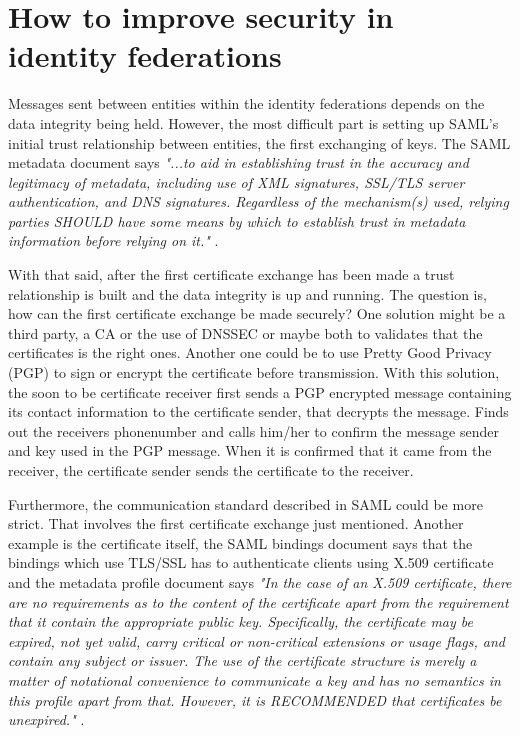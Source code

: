 \section{How to improve security in identity federations}

Messages sent between entities within the identity federations depends on the data integrity being held.
However, the most difficult part is setting up SAML's initial trust relationship between entities, the first exchanging of keys.
The SAML metadata document says \emph{"...to aid in establishing trust in the accuracy and legitimacy of metadata,
including use of XML signatures, SSL/TLS server authentication, and DNS signatures.
Regardless of the mechanism(s) used, relying parties SHOULD have some means by which to establish trust in metadata information
before relying on it."} \cite[p.~29]{pdf:oasis-open-metadata}.

With that said, after the first certificate exchange has been made a trust relationship is built and the data integrity is up and running. 
The question is, how can the first certificate exchange be made securely? 
One solution might be a third party, a CA or the use of DNSSEC or maybe both to validates that the certificates is the right ones.
Another one could be to use Pretty Good Privacy (PGP)  \cite{rfc:2440} to sign or encrypt the certificate before transmission.
With this solution, the soon to be certificate receiver first sends a PGP encrypted message containing its contact
information to the certificate sender, that decrypts the message. Finds out the receivers phonenumber and calls him/her
to confirm the message sender and key used in the PGP message.
When it is confirmed that it came from the receiver, the certificate sender sends the certificate to the receiver.

Furthermore, the communication standard described in SAML could be more strict.
That involves the first certificate exchange just mentioned. 
Another example is the certificate itself, the SAML bindings document says  
that the bindings which use TLS/SSL has to authenticate clients using X.509 certificate \cite[p.~8]{pdf:oasis-open-bindings} and the metadata profile document says
\emph{"In the case of an X.509 certificate, there are no requirements as to the content of the certificate apart from the requirement 
that it contain the appropriate public key. 
Specifically, the certificate may be expired, not yet valid, carry critical or non-critical extensions or usage flags, and contain 
any subject or issuer. 
The use of the certificate structure is merely a matter of notational convenience to communicate a key and has no semantics in this 
profile apart from that. 
However, it is RECOMMENDED that certificates be unexpired."} \cite[p.~11]{pdf:oasis-open-metadata-profile}. 

